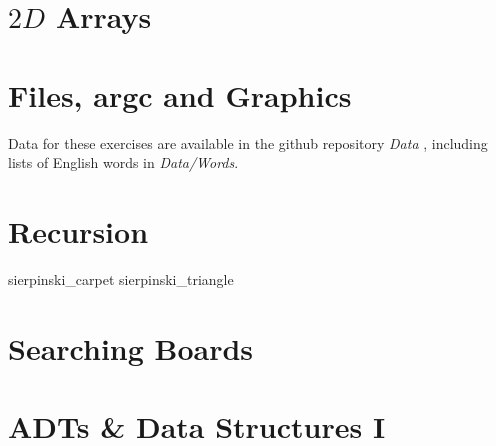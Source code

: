 \chapter{$2D$ Arrays}











\chapter{Files, argc and Graphics}

Data for these exercises
are available in the github repository {\em Data}
, including lists of English words in {\em Data/Words}.







\setcounter{chapter}{6}
\chapter{Recursion}






 {sierpinski_carpet}
 {sierpinski_triangle}

%

\chapter{Searching Boards}









\chapter{ADTs \& Data Structures I}

